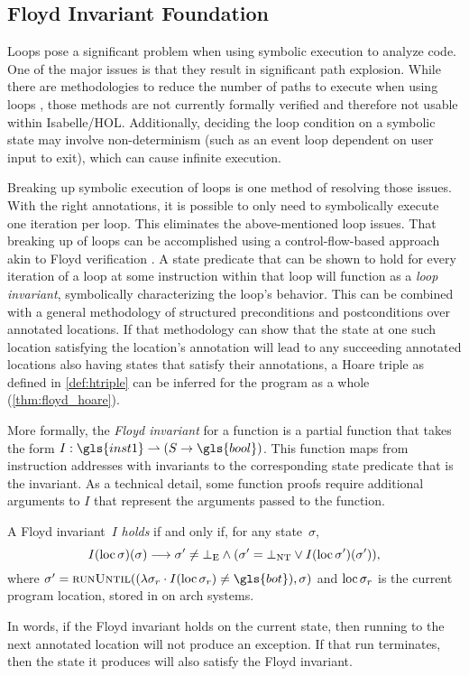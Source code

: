 \subsection{Floyd Invariant Foundation}\label{se:cfg_invariant}
Loops pose a significant problem when using symbolic execution to analyze code.%
One of the major issues is that they result in significant path explosion.%
While there are methodologies to reduce the number of paths to execute
when using loops \autocite{saxena2009lese,obdrzalek2011efficient},
those methods are not currently formally verified
and therefore not usable within Isabelle/HOL.
Additionally, deciding the loop condition on a symbolic state
may involve non-determinism (such as an event loop dependent on user input to exit),%
which can cause infinite execution.

Breaking up symbolic execution of loops is one method of resolving those issues.
With the right annotations,
it is possible to only need to symbolically execute one iteration per loop.
This eliminates the above-mentioned loop issues.
That breaking up of loops can be accomplished using a control-flow-based approach
akin to Floyd verification \autocite{floyd1967assigning}.%
A state predicate that can be shown to hold for every iteration of a loop
at some instruction within that loop will function as a \emph{loop invariant},%
symbolically characterizing the loop's behavior.
This can be combined with a general methodology of structured preconditions and postconditions over annotated locations.
If that methodology can show that the state at one such location
satisfying the location's annotation will lead to any succeeding annotated locations
also having states that satisfy their annotations,
a Hoare triple as defined in \cref{def:htriple}
can be inferred for the program as a whole (\cref{thm:floyd_hoare}).

More formally, the \emph{Floyd invariant}%
for a function is a partial function that takes the form
$I:\gls{inst1}\rightharpoonup(S\rightarrow\gls{bool})$.
This function maps from instruction addresses with invariants
to the corresponding state predicate that is the invariant.
As a technical detail, some function proofs require additional arguments to $I$
that represent the arguments passed to the function.
\begin{definition}\label{def:floyd_inv}
  A Floyd invariant~$I$ \emph{holds} if and only if, for any state~$\sigma$,
  \begin{equation}
    I(\operatorname{loc}\sigma)(\sigma)\longrightarrow
    \sigma'\neq\bot_\mathrm{E}\land(\sigma'=\bot_\mathrm{NT}\lor I(\operatorname{loc}\sigma')(\sigma')),
  \end{equation}
  where
  $\sigma'=\run((\lambda\sigma_r\cdot I(\loc\sigma_r)\neq\gls{bot}),\sigma)$%
  and $\operatorname{loc}\sigma_r$ is the current program location,
  stored in  on \gls{arch} systems.
\end{definition}
In words, if the Floyd invariant holds on the current state,
then running to the next annotated location will not produce an exception.
If that run terminates, then the state it produces
will also satisfy the Floyd invariant.

